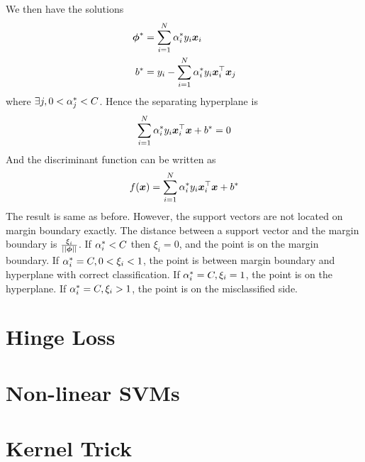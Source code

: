 We then have the solutions
\begin{align*}
	\boldsymbol{\phi}^*&=\sum_{i=1}^N\alpha_i^*y_i\boldsymbol{x}_i \\
	b^*&=y_i-\sum_{i=1}^N\alpha_i^*y_i\boldsymbol{x}_i^\top\boldsymbol{x}_j
\end{align*}
where $\exists j,0<\alpha_j^*<C$. Hence the separating hyperplane is
\begin{align*}
	\sum_{i=1}^N\alpha_i^*y_i\boldsymbol{x}_i^\top\boldsymbol{x}+b^*=0
\end{align*}
And the discriminant function can be written as
\begin{align*}
	f(\boldsymbol{x})=\sum_{i=1}^N\alpha_i^*y_i\boldsymbol{x}_i^\top\boldsymbol{x}+b^*
\end{align*}
The result is same as before. However, the support vectors are not located on margin boundary exactly. The distance between a support vector and the margin boundary is $\frac{\xi_i}{\left\vert\left\vert \boldsymbol{\phi} \right\vert\right\vert}$. If $\alpha_i^*<C$ then $\xi_i=0$, and the point is on the margin boundary. If $\alpha_i^*=C,0<\xi_i<1$, the point is between margin boundary and hyperplane with correct classification. If $\alpha_i^*=C,\xi_i=1$, the point is on the hyperplane. If $\alpha_i^*=C,\xi_i>1$, the point is on the misclassified side.



\section{Hinge Loss}

\section{Non-linear SVMs}

\section{Kernel Trick}